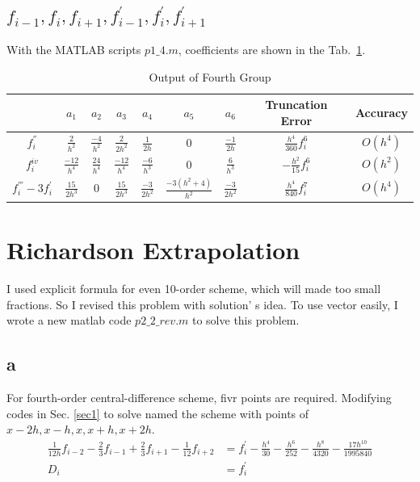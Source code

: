\documentclass[letterpaper,10pt]{article}
\begin{document}
\subsection{$f_{i-1},f_{i},f_{i+1},f_{i-1}^{'},f_{i}^{'},f_{i+1}^{'}$}
With the MATLAB scripts $p1\_4.m$, coefficients are shown in the Tab.~\ref{tab1_4}. 
\begin{table}[htbp]
  \centering  
  \caption{Output of Fourth Group}\label{tab1_4}
  \begin{tabular}{ccccccccc}
    \hline
    & $a_1$ & $a_2$ & $a_3$ & $a_4$& $a_5$ & $a_6$& Truncation Error& Accuracy\\
    \hline
    $f_{i}^{''}$ & $\frac{2}{h^2}$ & $\frac{-4}{h^2}$ & $\frac{2}{2h^2}$ & $\frac{1}{2h}$ &0& $\frac{-1}{2h}$ & $\frac{h^4}{360}f_{i}^{6}$& $O\left(h^4\right)$\\
    $f_{i}^{iv}$ & $\frac{-12}{h^4}$ & $\frac{24}{h^4}$ & $\frac{-12}{h^4}$ & $\frac{-6}{h^3}$ &0& $\frac{6}{h^3}$ & $-\frac{h^2}{15}f_{i}^{6}$& $O\left(h^2\right)$\\
    $f_{i}^{'''}-3f_{i}^{'}$ & $\frac{15}{2h^3}$ & $0$ & $\frac{15}{2h^3}$ & $\frac{-3}{2h^2}$ & $\frac{-3\left(h^2+4\right)}{h^2}$ & $\frac{-3}{2h^2}$&$\frac{h^4}{840}f_{i}^{7}$&$O\left(h^4\right)$\\
    \hline
  \end{tabular}
\end{table}

\section{Richardson Extrapolation}
I used explicit formula for even 10-order scheme, which will made too small fractions. 
So I revised this problem with solution' s idea. To use vector easily, I wrote a new matlab code 
$p2\_2\_{rev}.m$ to solve this problem. 

\subsection{a}
For fourth-order central-difference scheme, fivr points are required. Modifying codes in Sec. \ref{sec1} to solve named 
the scheme with points of $x-2h, x-h, x, x+h, x+2h$. 
\begin{align*}
  \frac{1}{12h}f_{i-2}-\frac{2}{3}f_{i-1}+\frac{2}{3}f_{i+1}-\frac{1}{12}f_{i+2}
  &= f_{i}^{'} - \frac{h^4}{30} - \frac{h^6}{252} - \frac{h^8}{4320} - \frac{17h^{10}}{1995840}\\
  D_i&=f_{i}^{'}
\end{align*}
\end{document}
